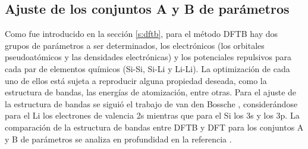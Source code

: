 \subsection{Ajuste de los conjuntos A y B de parámetros}

Como fue introducido en la sección \ref{s:dftb}, para el método DFTB hay dos 
grupos de parámetros a ser determinados, los electrónicos (los orbitales 
pseudoatómicos y las densidades electrónicas) y los potenciales repulsivos para 
cada par de elementos químicos (Si-Si, Si-Li y Li-Li). La optimización de cada 
uno de ellos está sujeta a reproducir alguna propiedad deseada, como la 
estructura de bandas, las energías de atomización, entre otras. Para el ajuste
de la estructura de bandas se siguió el trabajo de van den Bossche \cite{van2019},
considerándose para el Li los electrones de valencia 2s mientras que para el Si 
los 3s y los 3p. La comparación de la estructura de bandas entre DFTB y DFT para 
los conjuntos A y B de parámetros se analiza en profundidad en la referencia 
\cite{oviedo2023}.


